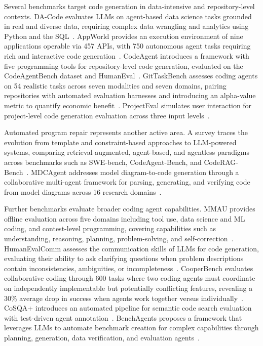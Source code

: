 \documentclass[
english,                 %
bibtex,                  %
includeExtraAbstracts, %
]{kththesis}
\numberwithin{listing}{chapter}
\begin{document}
Several benchmarks target code generation in data-intensive and repository-level contexts. \gls{DA}-Code evaluates \glspl{LLM} on agent-based data science tasks grounded in real and diverse data, requiring complex data wrangling and analytics using Python and the \gls{SQL}~\cite{huang_da-code_2024}. AppWorld provides an execution environment of nine applications operable via 457 \glspl{API}, with 750 autonomous agent tasks requiring rich and interactive code generation~\cite{trivedi_appworld_2024}. CodeAgent introduces a framework with five programming tools for repository-level code generation, evaluated on the CodeAgentBench dataset and HumanEval~\cite{zhang_codeagent_2024}. GitTaskBench assesses coding agents on 54 realistic tasks across seven modalities and seven domains, pairing repositories with automated evaluation harnesses and introducing an alpha-value metric to quantify economic benefit~\cite{ni_gittaskbench_2026}. ProjectEval simulates user interaction for project-level code generation evaluation across three input levels~\cite{liu_projecteval_2025}.

Automated program repair represents another active area. A survey traces the evolution from template and constraint-based approaches to \gls{LLM}-powered systems, comparing retrieval-augmented, agent-based, and agentless paradigms across benchmarks such as \gls{SWE}-bench, CodeAgent-Bench, and Code\gls{RAG}-Bench~\cite{puvvadi_coding_2025}. \gls{MDC}Agent addresses model diagram-to-code generation through a collaborative multi-agent framework for parsing, generating, and verifying code from model diagrams across 16 research domains~\cite{wang_model_2025}.

Further benchmarks evaluate broader coding agent capabilities. \gls{MMAU} provides offline evaluation across five domains including tool use, data science and \gls{ML} coding, and contest-level programming, covering capabilities such as understanding, reasoning, planning, problem-solving, and self-correction~\cite{yin_mmau_2025}. HumanEvalComm assesses the communication skills of \glspl{LLM} for code generation, evaluating their ability to ask clarifying questions when problem descriptions contain inconsistencies, ambiguities, or incompleteness~\cite{wu_humanevalcomm_2025}. CooperBench evaluates collaborative coding through 600 tasks where two coding agents must coordinate on independently implementable but potentially conflicting features, revealing a 30\% average drop in success when agents work together versus individually~\cite{khatua_cooperbench_2026}. \gls{CoSQA}+ introduces an automated pipeline for semantic code search evaluation with test-driven agent annotation~\cite{gong_cosqa_2026}. BenchAgents proposes a framework that leverages \glspl{LLM} to automate benchmark creation for complex capabilities through planning, generation, data verification, and evaluation agents~\cite{butt_benchagents_2025}. 
\end{document}
